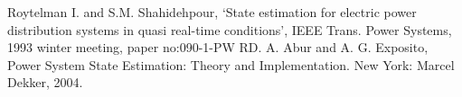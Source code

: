 
\begin{thebibliography}{00}
   Roytelman I. and S.M. Shahidehpour, ‘State estimation for electric power distribution systems in quasi real-time conditions’, IEEE Trans. Power Systems, 1993 winter meeting, paper no:090-1-PW RD.
   A. Abur and A. G. Exposito, Power System State Estimation: Theory and Implementation. New York: Marcel Dekker, 2004.
\end{thebibliography}
